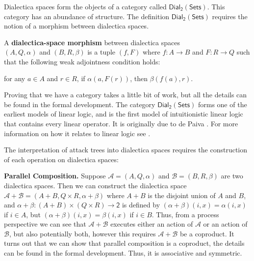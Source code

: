 \documentclass{llncs}
\newcommand{\cat}[1]{\mathcal{#1}}
\newcommand{\dial}[0]{\mathsf{Dial_2}(\mathsf{Sets})}
\newenvironment{changemargin}[2]{%
  \begin{list}{}{%
    \setlength{\topsep}{0pt}%
    \setlength{\leftmargin}{#1}%
    \setlength{\rightmargin}{#2}%
    \setlength{\listparindent}{\parindent}%
    \setlength{\itemindent}{\parindent}%
    \setlength{\parsep}{\parskip}%
  }%
  \item[]}{\end{list}}
\begin{document}
Dialectica spaces form the objects of a category called $\dial$.  This
category has an abundance of structure.  The definition $\dial$
requires the notion of a morphism between dialectica spaces.
\begin{definition}
  \label{def:dial-space-morphism}
  A \textbf{dialectica-space morphism} between dialectica spaces
  \\ $(A , Q, \alpha)$ and $(B , R , \beta)$ is a tuple $(f, F)$ where
  $f : A \to B$ and $F : R \to Q$ such that the following weak
  adjointness condition holds:
  \begin{center}
    for any $a \in A$ and $r \in R$, if $\alpha(a,F(r))$, then
    $\beta(f(a), r)$. 
  \end{center}
\end{definition}
Proving that we have a category takes a little bit of work, but all
the details can be found in the formal development.  The category
$\dial$ forms one of the earliest models of linear logic, and is the
first model of intuitionistic linear logic that contains every linear
operator. It is originally due to de Paiva \cite{?}. For more
information on how it relates to linear logic see \cite{Eades:2016}.

The interpretation of attack trees into dialectica spaces requires the
construction of each operation on dialectica spaces:

\begin{changemargin}{5pt}{5pt}\noindent
\textbf{Parallel Composition.} Suppose $\cat{A} = (A , Q, \alpha)$ and
$\cat{B} = (B , R , \beta)$ are two dialectica spaces.  Then we can
construct the dialectica space $\cat{A} + \cat{B} = (A + B, Q \times
R, \alpha + \beta)$ where $A + B$ is the disjoint union of $A$ and
$B$, and $\alpha + \beta : (A + B) \times (Q \times R) \to \mathsf{2}$
is defined by $(\alpha + \beta)(i , x) = \alpha(i , x)$ if $i \in A$,
but $(\alpha + \beta)(i , x) = \beta(i , x)$ if $i \in B$.  Thus, from
a process perspective we can see that $\cat{A} + \cat{B}$ executes
either an action of $\cat{A}$ or an action of $\cat{B}$, but also
potentially both, however this requires $\cat{A} + \cat{B}$ be a
coproduct.  It turns out that we can show that parallel composition is
a coproduct, the details can be found in the formal development.
Thus, it is associative and symmetric.
\end{changemargin}
\end{document}
